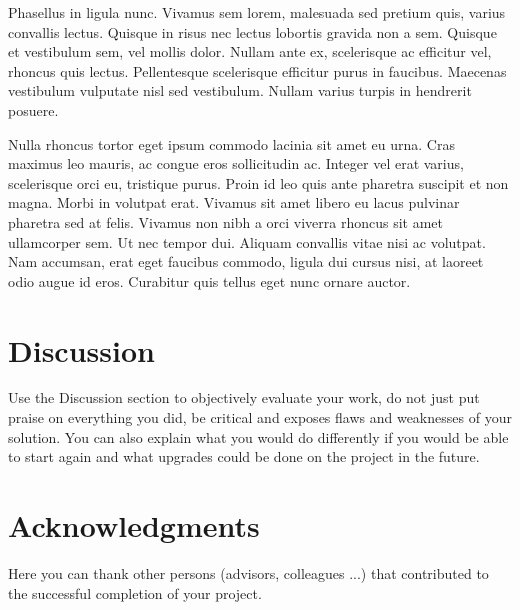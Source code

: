 \documentclass[fleqn,moreauthors,10pt]{ds_report}
\begin{document}
Phasellus in ligula nunc. Vivamus sem lorem, malesuada sed pretium quis, varius convallis lectus. Quisque in risus nec lectus lobortis gravida non a sem. Quisque et vestibulum sem, vel mollis dolor. Nullam ante ex, scelerisque ac efficitur vel, rhoncus quis lectus. Pellentesque scelerisque efficitur purus in faucibus. Maecenas vestibulum vulputate nisl sed vestibulum. Nullam varius turpis in hendrerit posuere.

Nulla rhoncus tortor eget ipsum commodo lacinia sit amet eu urna. Cras maximus leo mauris, ac congue eros sollicitudin ac. Integer vel erat varius, scelerisque orci eu, tristique purus. Proin id leo quis ante pharetra suscipit et non magna. Morbi in volutpat erat. Vivamus sit amet libero eu lacus pulvinar pharetra sed at felis. Vivamus non nibh a orci viverra rhoncus sit amet ullamcorper sem. Ut nec tempor dui. Aliquam convallis vitae nisi ac volutpat. Nam accumsan, erat eget faucibus commodo, ligula dui cursus nisi, at laoreet odio augue id eros. Curabitur quis tellus eget nunc ornare auctor.



\section*{Discussion}

Use the Discussion section to objectively evaluate your work, do not just put praise on everything you did, be critical and exposes flaws and weaknesses of your solution. You can also explain what you would do differently if you would be able to start again and what upgrades could be done on the project in the future.



\section*{Acknowledgments}

Here you can thank other persons (advisors, colleagues ...) that contributed to the successful completion of your project.




\end{document}
